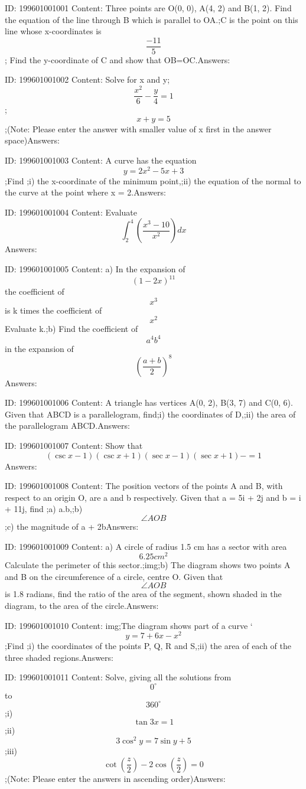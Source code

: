 \documentclass{article}
\begin{document}
ID: 199601001001
Content:
Three points are O(0, 0), A(4, 2) and B(1, 2). Find the equation of the line through B which is parallel to OA.;C is the point on this line whose x-coordinates is \[\frac{-11}{5}\]; Find the y-coordinate of C and show that OB=OC.Answers:

ID: 199601001002
Content:
Solve for x and y; \[\frac{x^{2}}{6}-\frac{y}{4}=1\] ; \[x+y=5\];(Note: Please enter the answer with smaller value of x first in the answer space)Answers:

ID: 199601001003
Content:
A curve has the equation \[y=2x^2-5x+3\] ;Find ;i) the x-coordinate of the minimum point,;ii) the equation of the normal to the curve at the point where x = 2.Answers:

ID: 199601001004
Content:
Evaluate \[\int_{2}^{4}(\frac{x^3-10}{x^2})dx\]Answers:

ID: 199601001005
Content:
a) In the expansion of \[(1-2x)^{11}\] the coefficient of  \[x^3\] is k times the coefficient of \[x^2\] Evaluate k.;b) Find the coefficient of \[a^4b^4\] in the expansion of \[\left ( \frac{a+b}{2} \right )^8\]Answers:

ID: 199601001006
Content:
A triangle has vertices A(0, 2), B(3, 7) and C(0, 6). Given that ABCD is a parallelogram, find;i)	the coordinates of D,;ii)	the area of the parallelogram ABCD.Answers:

ID: 199601001007
Content:
Show that \[(\csc x-1)(\csc x+1)(\sec x-1)(\sec x+1)-=1\]Answers:

ID: 199601001008
Content:
The position vectors of the points A and B, with respect to an origin O, are a and b respectively. Given that a = 5i + 2j and b = i + 11j, find ;a) a.b,;b) \[\angle AOB\];c) the magnitude of a + 2bAnswers:

ID: 199601001009
Content:
a) A circle of radius 1.5 cm has a sector with area \[6.25 cm^2\] Calculate the perimeter of this sector.;img;b) The diagram shows two points A and B on the circumference of a circle, centre O. Given that \[\angle AOB\] is 1.8 radians, find the ratio of the area of the segment, shown shaded in the diagram, to the area of the circle.Answers:

ID: 199601001010
Content:
img;The diagram shows part of a curve `\[y=7+6x-x^2\];Find ;i)	the coordinates of the points P, Q, R and S,;ii)	the area of each of the three shaded regions.Answers:

ID: 199601001011
Content:
Solve, giving all the solutions from \[0^{\circ}\]to \[360^{\circ}\];i) \[\tan3x=1\] ;ii) \[3\cos^2y=7\sin y+5\] ;iii) \[\cot(\frac{z}{2})-2\cos(\frac{z}{2})=0\];(Note: Please enter the answers in ascending order)Answers:
\end{document}
